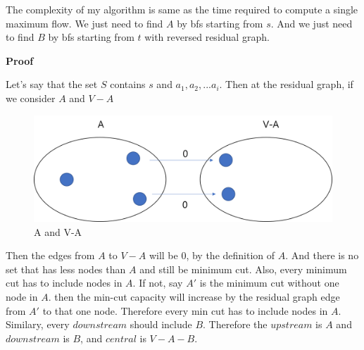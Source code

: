 \documentclass[a4paper,11pt]{article}
\begin{document}
\begin{enumerate}
The complexity of my algorithm is same as the time required to compute a single maximum flow. We just need to find $A$ by bfs starting from $s$. And we just need to find $B$ by bfs starting from $t$ with reversed residual graph.


{\bf Proof}

Let's say that the set $S$ contains $s$ and $a_1, a_2, ... a_i$. Then at the residual graph, if we consider $A$ and $V-A$

\begin{figure}[hbt]
	\centering
	\includegraphics[scale=0.4]{figure1.png}
	\caption{A and V-A}
\end{figure}

Then the edges from $A$ to $V-A$ will be 0, by the definition of $A$.
And there is no set that has less nodes than $A$ and still be minimum cut.
Also, every minimum cut has to include nodes in $A$.
If not, say $A'$ is the minimum cut without one node in $A$. then the min-cut capacity will increase by the residual graph edge from $A'$ to that one node. Therefore every min cut has to include nodes in $A$. 
Similary, every $downstream$ should include $B$. 
Therefore the $upstream$ is $A$ and $downstream$ is $B$, and $central$ is $V-A-B$.


\end{enumerate}
\end{document}
